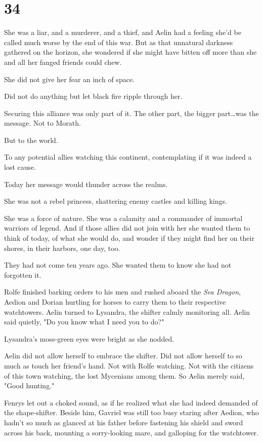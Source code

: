 
\chapter{34}

She was a liar, and a murderer, and a thief, and Aelin had a feeling she'd be called much worse by the end of this war.
But as that unnatural darkness gathered on the horizon, she wondered if she might have bitten off more than she and all her fanged friends could chew.

She did not give her fear an inch of space.

Did not do anything but let black fire ripple through her.

Securing this alliance was only part of it.
The other part, the bigger part\ldots was the message.
Not to Morath.

But to the world.

To any potential allies watching this continent, contemplating if it was indeed a lost cause.

Today her message would thunder across the realms.

She was not a rebel princess, shattering enemy castles and killing kings.

She was a force of nature.
She was a calamity and a commander of immortal warriors of legend.
And if those allies did not join with her  she wanted them to think of today, of what she would do, and wonder if they might find her on their shores, in their harbors, one day, too.

They had not come ten years ago.
She wanted them to know she had not forgotten it.

Rolfe finished barking orders to his men and rushed aboard the \emph{Sea Dragon}, Aedion and Dorian hurtling for horses to carry them to their respective watchtowers.
Aelin turned to Lysandra, the shifter calmly monitoring all.
Aelin said quietly, "Do you know what I need you to do?"

Lysandra's moss-green eyes were bright as she nodded.

Aelin did not allow herself to embrace the shifter.
Did not allow herself to so much as touch her friend's hand.
Not with Rolfe watching.
Not with the citizens of this town watching, the lost Mycenians among them.
So Aelin merely said, "Good hunting."

Fenrys let out a choked sound, as if he realized what she had indeed demanded of the shape-shifter.
Beside him, Gavriel was still too busy staring after Aedion, who hadn't so much as glanced at his father before fastening his shield and sword across his back, mounting a sorry-looking mare, and galloping for the watchtower.

